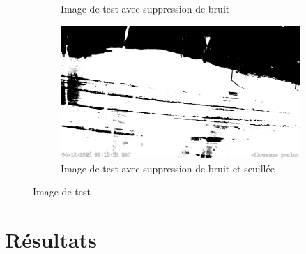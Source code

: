 \begin{figure}[H]
\begin{subfigure}{.45\textwidth}
        \caption{Image de test avec suppression de bruit}
        \label{fig:SnowOnRoad_test_denoised}
    \end{subfigure}
    \hfill
    \begin{subfigure}{.45\textwidth}
        \includegraphics[width=\linewidth]{Images/computer_vision/snowOnRoad/test_denoisedThres.png}
        \caption{Image de test avec suppression de bruit et seuillée}
        \label{fig:SnowOnRoad_test_denoisedThres}
    \end{subfigure}
    \caption{Image de test}
    \label{fig:SnowOnRoad_test}
\end{figure}
\newpage


\section{Résultats}